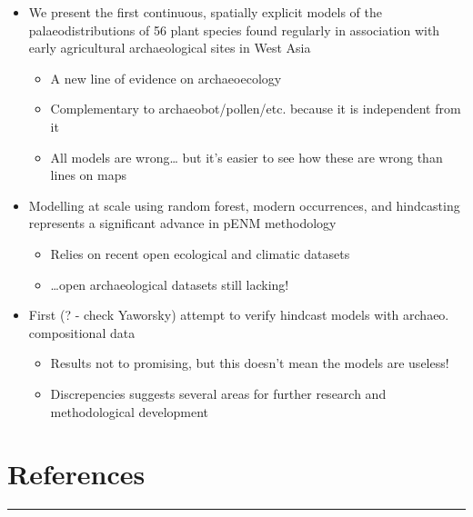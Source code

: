 \documentclass[
  authoryear,
  preprint]{elsarticle}
\providecommand{\tightlist}{%
  \setlength{\itemsep}{0pt}\setlength{\parskip}{0pt}}\usepackage{longtable,booktabs,array}
\begin{document}
\begin{itemize}
\tightlist
\item
  We present the first continuous, spatially explicit models of the
  palaeodistributions of 56 plant species found regularly in association
  with early agricultural archaeological sites in West Asia

  \begin{itemize}
  \tightlist
  \item
    A new line of evidence on archaeoecology
  \item
    Complementary to archaeobot/pollen/etc. because it is independent
    from it
  \item
    All models are wrong\ldots{} but it's easier to see how these are
    wrong than lines on maps
  \end{itemize}
\item
  Modelling at scale using random forest, modern occurrences, and
  hindcasting represents a significant advance in pENM methodology

  \begin{itemize}
  \tightlist
  \item
    Relies on recent open ecological and climatic datasets
  \item
    \ldots open archaeological datasets still lacking!
  \end{itemize}
\item
  First (? - check Yaworsky) attempt to verify hindcast models with
  archaeo. compositional data

  \begin{itemize}
  \tightlist
  \item
    Results not to promising, but this doesn't mean the models are
    useless!
  \item
    Discrepencies suggests several areas for further research and
    methodological development
  \end{itemize}
\end{itemize}

\section{References}\label{references}

\begin{center}\rule{0.5\linewidth}{0.5pt}\end{center}


  
\end{document}
